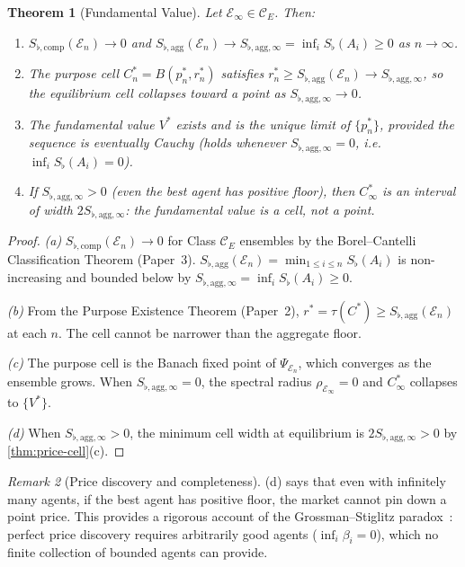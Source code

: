 \documentclass[twocolumn,11pt,a4paper]{article}
\newtheorem{theorem}{Theorem}[section]
\theoremstyle{remark}
\newtheorem{remark}[theorem]{Remark}
\newcommand{\Sflat}{S_{\flat}}
\newcommand{\tol}{\tau}
\newcommand{\Ens}{\mathcal{E}}
\newcommand{\MidP}{p^*}                  %
\newcommand{\FV}{V^*}                    %
\newcommand{\SflatT}{S_{\flat,\mathrm{agg}}}        %
\newcommand{\SflatI}{S_{\flat,\mathrm{comp}}}       %
\newcommand{\SflatTinf}{S_{\flat,\mathrm{agg},\infty}}  %
\newcommand{\srad}{\rho}               %
\begin{document}
\begin{theorem}[Fundamental Value]
\label{thm:fv}
Let $\Ens_\infty \in \mathcal{C}_E$.  Then:
\begin{enumerate}[label=\textup{(\alph*)}]
\item $\SflatI(\Ens_n) \to 0$ and $\SflatT(\Ens_n) \to \SflatTinf
  = \inf_i \Sflat(A_i) \ge 0$ as $n\to\infty$.
\item The purpose cell $C^*_n = B(\MidP_n, r^*_n)$ satisfies $r^*_n \ge
  \SflatT(\Ens_n) \to \SflatTinf$, so the equilibrium cell collapses
  toward a point as $\SflatTinf \to 0$.
\item The fundamental value $\FV$ exists and is the unique limit of
  $\{\MidP_n\}$, provided the sequence is eventually Cauchy (holds whenever
  $\SflatTinf = 0$, i.e.\ $\inf_i \Sflat(A_i) = 0$).
\item If $\SflatTinf > 0$ (even the best agent has positive floor),
  then $C^*_\infty$ is an interval of width $2\SflatTinf$: the
  fundamental value is a cell, not a point.
\end{enumerate}
\end{theorem}
\begin{proof}
\textit{(a)}  $\SflatI(\Ens_n) \to 0$ for Class $\mathcal{C}_E$ ensembles by
the Borel--Cantelli Classification Theorem (Paper~3).  $\SflatT(\Ens_n) =
\min_{1\le i\le n}\Sflat(A_i)$ is non-increasing and bounded below by
$\SflatTinf = \inf_i \Sflat(A_i) \ge 0$.

\textit{(b)}  From the Purpose Existence Theorem (Paper~2), $r^* = \tol(C^*)
\ge \SflatT(\Ens_n)$ at each $n$.  The cell cannot be narrower than the
aggregate floor.

\textit{(c)}  The purpose cell is the Banach fixed point of $\Psi_{\Ens_n}$,
which converges as the ensemble grows.  When $\SflatTinf = 0$, the
spectral radius $\srad_{\Ens_\infty} = 0$ and $C^*_\infty$ collapses to
$\{\FV\}$.

\textit{(d)}  When $\SflatTinf > 0$, the minimum cell width at
equilibrium is $2\SflatTinf > 0$ by \cref{thm:price-cell}(c).
\end{proof}

\begin{remark}[Price discovery and completeness]
(d) says that even with infinitely many agents, if the best
agent has positive floor, the market cannot pin down a point price.  This
provides a rigorous account of the Grossman--Stiglitz
paradox~\cite{grossmanstiglitz1980}: perfect price discovery requires
arbitrarily good agents ($\inf_i\beta_i = 0$), which no finite collection
of bounded agents can provide.
\end{remark}
\end{document}
